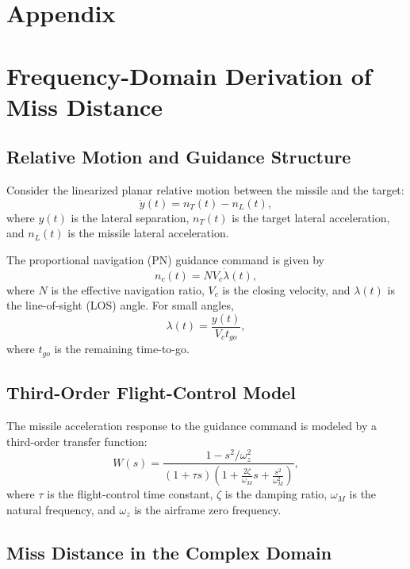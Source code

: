 \documentclass[11pt,a4paper]{article}
\begin{document}
\appendix
\section*{Appendix}
\section{Frequency-Domain Derivation of Miss Distance}

\subsection{Relative Motion and Guidance Structure}

Consider the linearized planar relative motion between the missile and the target:
\begin{equation}
\ddot y(t) = n_T(t) - n_L(t),
\end{equation}
where $y(t)$ is the lateral separation, $n_T(t)$ is the target lateral acceleration, and $n_L(t)$ is the missile lateral acceleration.

The proportional navigation (PN) guidance command is given by
\begin{equation}
n_c(t) = N V_c \dot{\lambda}(t),
\end{equation}
where $N$ is the effective navigation ratio, $V_c$ is the closing velocity, and $\lambda(t)$ is the line-of-sight (LOS) angle. For small angles,
\begin{equation}
\lambda(t) = \frac{y(t)}{V_c t_{go}},
\end{equation}
where $t_{go}$ is the remaining time-to-go.

\subsection{Third-Order Flight-Control Model}

The missile acceleration response to the guidance command is modeled by a third-order transfer function:
\begin{equation}
W(s) =
\frac{1 - s^2 / \omega_z^2}
{(1 + \tau s)
\left(1 + \frac{2\zeta}{\omega_M}s + \frac{s^2}{\omega_M^2}\right)},
\end{equation}
where $\tau$ is the flight-control time constant, $\zeta$ is the damping ratio, $\omega_M$ is the natural frequency, and $\omega_z$ is the airframe zero frequency.

\subsection{Miss Distance in the Complex Domain}
\end{document}
